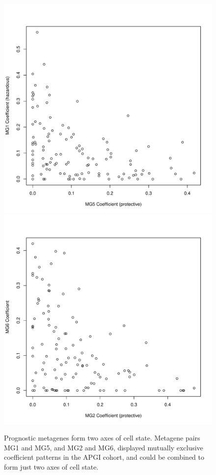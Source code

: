 \documentclass[dissertation.tex]{subfiles}
\begin{document}
\begin{figure}
\centering
\includegraphics[width=.45\linewidth]{analysis/biosurv/reports/18_SIS_diag_dsd_final/figure/metagene-pairs-8}
\includegraphics[width=.45\linewidth]{analysis/biosurv/reports/18_SIS_diag_dsd_final/figure/metagene-pairs-9}
\caption[Prognostic metagenes form two axes of cell state]{Prognostic metagenes form two axes of cell state.  Metagene pairs MG1 and MG5, and MG2 and MG6, displayed mutually exclusive coefficient patterns in the \acrshort{APGI} cohort, and could be combined to form just two axes of cell state.}\label{fig:sigs-coef-mutualexclusion}
\end{figure}
\end{document}
